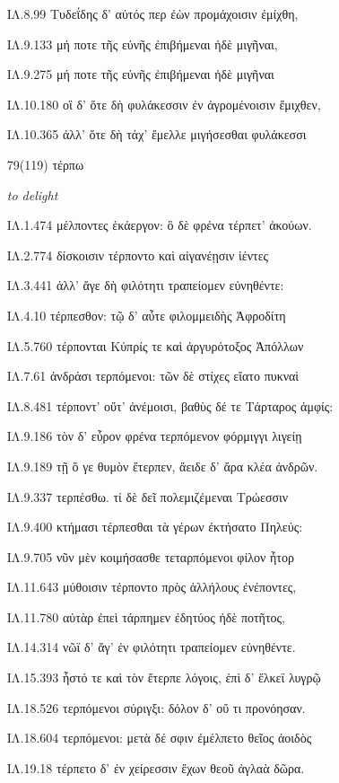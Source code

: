 \begin{enumerate}
{ΙΛ.8.99 Τυδεΐδης δ' αὐτός περ ἐὼν προμάχοισιν ἐμίχθη, 

ΙΛ.9.133 μή ποτε τῆς εὐνῆς ἐπιβήμεναι ἠδὲ μιγῆναι, 

ΙΛ.9.275 μή ποτε τῆς εὐνῆς ἐπιβήμεναι ἠδὲ μιγῆναι 

ΙΛ.10.180 οἳ δ' ὅτε δὴ φυλάκεσσιν ἐν ἀγρομένοισιν ἔμιχθεν, 

ΙΛ.10.365 ἀλλ' ὅτε δὴ τάχ' ἔμελλε μιγήσεσθαι φυλάκεσσι 

}

\clearpage
\item[\large 79(119)]{\large \g τέρπω	}

\hspace{0.2cm} \textit{ to delight }

{\g
ΙΛ.1.474 μέλποντες ἑκάεργον: ὃ δὲ φρένα τέρπετ' ἀκούων. 

ΙΛ.2.774 δίσκοισιν τέρποντο καὶ αἰγανέῃσιν ἱέντες 

ΙΛ.3.441 ἀλλ' ἄγε δὴ φιλότητι τραπείομεν εὐνηθέντε: 

ΙΛ.4.10 τέρπεσθον: τῷ δ' αὖτε φιλομμειδὴς Ἀφροδίτη 

ΙΛ.5.760 τέρπονται Κύπρίς τε καὶ ἀργυρότοξος Ἀπόλλων 

ΙΛ.7.61 ἀνδράσι τερπόμενοι: τῶν δὲ στίχες εἵατο πυκναὶ 

ΙΛ.8.481 τέρποντ' οὔτ' ἀνέμοισι, βαθὺς δέ τε Τάρταρος ἀμφίς: 

ΙΛ.9.186 τὸν δ' εὗρον φρένα τερπόμενον φόρμιγγι λιγείῃ 

ΙΛ.9.189 τῇ ὅ γε θυμὸν ἔτερπεν, ἄειδε δ' ἄρα κλέα ἀνδρῶν. 

ΙΛ.9.337 τερπέσθω. τί δὲ δεῖ πολεμιζέμεναι Τρώεσσιν 

ΙΛ.9.400 κτήμασι τέρπεσθαι τὰ γέρων ἐκτήσατο Πηλεύς: 

ΙΛ.9.705 νῦν μὲν κοιμήσασθε τεταρπόμενοι φίλον ἦτορ 

ΙΛ.11.643 μύθοισιν τέρποντο πρὸς ἀλλήλους ἐνέποντες, 

ΙΛ.11.780 αὐτὰρ ἐπεὶ τάρπημεν ἐδητύος ἠδὲ ποτῆτος, 

ΙΛ.14.314 νῶϊ δ' ἄγ' ἐν φιλότητι τραπείομεν εὐνηθέντε. 

ΙΛ.15.393 ἧστό τε καὶ τὸν ἔτερπε λόγοις, ἐπὶ δ' ἕλκεϊ λυγρῷ 

ΙΛ.18.526 τερπόμενοι σύριγξι: δόλον δ' οὔ τι προνόησαν. 

ΙΛ.18.604 τερπόμενοι: μετὰ δέ σφιν ἐμέλπετο θεῖος ἀοιδὸς 

ΙΛ.19.18 τέρπετο δ' ἐν χείρεσσιν ἔχων θεοῦ ἀγλαὰ δῶρα. 

}
\end{enumerate}
